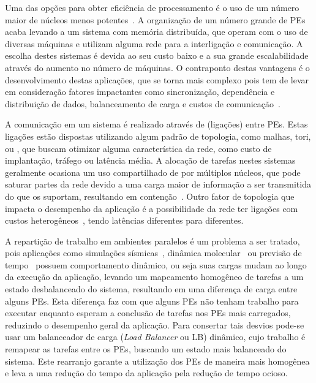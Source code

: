 Uma das opções para obter eficiência de processamento é o uso de um número maior de núcleos menos potentes~\cite{snir-encyclopedia}. A organização de um número grande de PEs acaba levando a um sistema com memória distribuída, que operam com o uso de diversas máquinas e utilizam alguma rede para a interligação e comunicação. A escolha destes sistemas é devida ao seu custo baixo e a sua grande escalabilidade através do aumento no número de máquinas. O contraponto destas vantagens é o desenvolvimento destas aplicações, que se torna mais complexo pois tem de levar em consideração fatores impactantes como sincronização, dependência e distribuição de dados, balanceamento de carga e custos de comunicação~\cite{pilla-thesis}.

A comunicação em um sistema é realizado através de \links (ligações) entre PEs. Estas ligações estão dispostas utilizando algum padrão de topologia, como malhas, tori, \fatts ou \dgfly, que buscam otimizar alguma característica da rede, como custo de implantação, tráfego ou latência média. 
A alocação de tarefas nestes sistemas geralmente ocasiona um uso compartilhado de \links por múltiplos núcleos, que pode saturar partes da rede devido a uma carga maior de informação a ser transmitida do que os \links suportam, resultando em contenção~\cite{bhatele-encyclopedia}. 
Outro fator de topologia que impacta o desempenho da aplicação é a possibilidade da rede ter ligações com custos heterogêneos~\cite{dragonfly}, tendo latências diferentes para \links diferentes.


A repartição de trabalho em ambientes paralelos é um problema a ser tratado, pois aplicações como simulações sísmicas~\cite{dupros,tesser}, dinâmica molecular~\cite{bhatele-kale} ou previsão de tempo~\cite{rodrigues} possuem comportamento dinâmico, ou seja suas cargas mudam ao longo da execução da aplicação, levando um mapeamento homogêneo de tarefas a um estado desbalanceado do sistema, resultando em uma diferença de carga entre alguns PEs. 
Esta diferença faz com que alguns PEs não tenham trabalho para executar enquanto esperam a conclusão de tarefas nos PEs mais carregados, reduzindo o desempenho geral da aplicação. 
Para consertar tais desvios pode-se usar um balanceador de carga (\textit{Load Balancer} ou LB) dinâmico, cujo trabalho é remapear as tarefas entre os PEs, buscando um estado mais balanceado do sistema. 
Este rearranjo garante a utilização dos PEs de maneira mais homogênea e leva a uma redução do tempo da aplicação pela redução de tempo ocioso.

